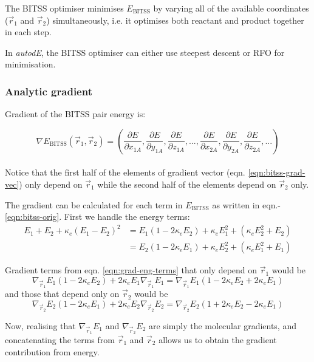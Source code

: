 \documentclass[10pt]{article}
\begin{document}
The BITSS optimiser minimises $E_\mathrm{BITSS}$ by varying all of the available coordinates ($\vec r_1$ and $\vec r_2$) simultaneously, i.e. it optimises both reactant and product together in each step.

In \emph{autodE}, the BITSS optimiser can either use steepest descent or RFO for minimisation.

\subsubsection{Analytic gradient}

Gradient of the BITSS pair energy is:

\begin{equation}
	\nabla E_\mathrm{BITSS} (\vec r_1, \vec r_2) = \left(\frac{\partial E}{\partial x_{1A}},\frac{\partial E}{\partial y_{1A}}, \frac{\partial E}{\partial z_{1A}}, ... , \frac{\partial E}{\partial x_{2A}},\frac{\partial E}{\partial y_{2A}},\frac{\partial E}{\partial z_{2A}}, ...\right)
	\label{eqn:bitss-grad-vec}
\end{equation}
\\
Notice that the first half of the elements of gradient vector (eqn. \ref{eqn:bitss-grad-vec}) only depend on $\vec r_1$ while the second half of the elements depend on $\vec r_2$ only.

The gradient can be calculated for each term in $E_\mathrm{BITSS}$ as written in eqn.-\ref{eqn:bitss-orig}. First we handle the energy terms:
\begin{equation}
	\begin{split}
		 E_1 + E_2 + \kappa_e(E_1 - E_2)^2 &  = E_1 (1-2\kappa_e E_2) + \kappa_e E_1^2 + (\kappa_e E_2^2 + E_2) \\
		 & = E_2(1-2\kappa_e E_1) + \kappa_e E_2^2 + (\kappa_e E_1^2 + E_1)
	\end{split} \label{eqn:grad-eng-terms}
\end{equation}

Gradient terms from eqn. \eqref{eqn:grad-eng-terms} that only depend on $\vec{r}_1$ would be $$\nabla_{\vec{r}_1} E_1(1-2\kappa_e E_2) + 2 \kappa_e E_1 \nabla_{\vec{r}_1} E_1 = \nabla_{\vec{r}_1}E_1(1-2\kappa_e E_2 + 2 \kappa_e E_1)$$
and those that depend only on $\vec{r}_2$ would be $$\nabla_{\vec{r}_2} E_2(1-2\kappa_e E_1) + 2 \kappa_e E_2 \nabla_{\vec{r}_2} E_2 = \nabla_{\vec{r}_2}E_2(1+2\kappa_e E_2 - 2 \kappa_e E_1)$$

Now, realising that $\nabla_{\vec{r}_1}E_1$ and $\nabla_{\vec{r}_2}E_2$ are simply the molecular gradients, and concatenating the terms from $\vec{r}_1$ and $\vec{r}_2$ allows us to obtain the gradient contribution from energy.
\end{document}
